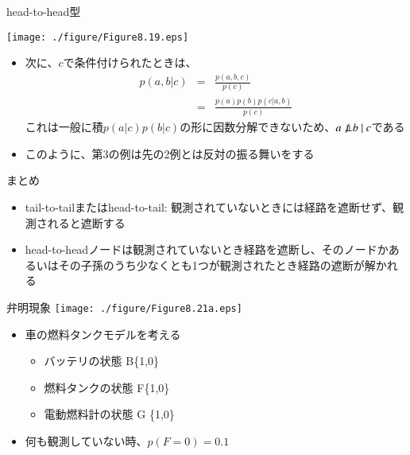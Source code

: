 \begin{frame}{head-to-head型}
 \begin{center}
  \texttt{[image: ./figure/Figure8.19.eps]}
 \end{center}
 \begin{itemize}
  \item 次に、$c$で条件付けられたときは、
        \begin{eqnarray*}
         p(a,b|c) &=& \frac{p(a,b,c)}{p(c)}\\
         &= & \frac{p(a)p(b)p(c|a,b)}{p(c)}
        \end{eqnarray*}
        これは一般に積$p(a|c)p(b|c)$の形に因数分解できないため、$a \nPerp \ b \ | \ c$である
  \item このように、第3の例は先の2例とは反対の振る舞いをする
 \end{itemize}
\end{frame}

\begin{frame}{まとめ}
 \begin{itemize}
  \item tail-to-tailまたはhead-to-tail: 観測されていないときには経路を遮断せず、観測されると遮断する
  \item head-to-headノードは観測されていないとき経路を遮断し、そのノードかあるいはその子孫のうち少なくとも1つが観測されたとき経路の遮断が解かれる
 \end{itemize}
\end{frame}

\begin{frame}{弁明現象}
 \texttt{[image: ./figure/Figure8.21a.eps]}
 \begin{itemize}
  \item 車の燃料タンクモデルを考える
        \begin{itemize}
         \item バッテリの状態 B\{1,0\}
         \item 燃料タンクの状態 F\{1,0\}
         \item 電動燃料計の状態 G \{1,0\}
        \end{itemize}
  \item 何も観測していない時、$p(F=0)= 0.1$
 \end{itemize}
\end{frame}

